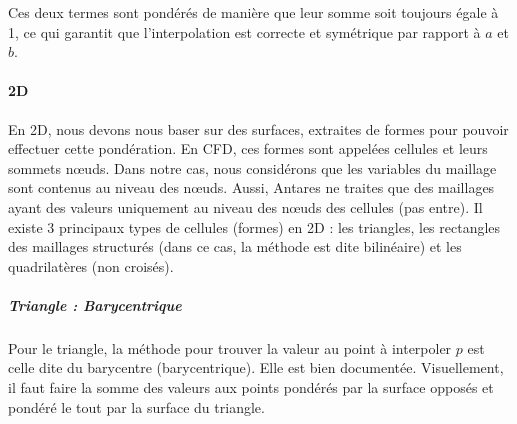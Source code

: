 Ces deux termes sont pondérés de manière que leur somme soit toujours égale à 1, ce
qui garantit que l'interpolation est correcte et symétrique par rapport à \( a \) et \( b \).\vspace{0.5cm}


\paragraph{2D}

En 2D, nous devons nous baser sur des surfaces, extraites de formes pour pouvoir effectuer cette pondération. En CFD, ces formes sont appelées cellules et leurs sommets nœuds. Dans notre cas, nous considérons que les variables du maillage sont contenus au niveau des nœuds. Aussi, Antares ne traites que des maillages ayant des valeurs uniquement au niveau des nœuds des cellules (pas entre).
Il existe 3 principaux types de cellules (formes) en 2D : les triangles, les rectangles des maillages structurés (dans ce cas, la méthode est dite bilinéaire) et les quadrilatères (non croisés).

\subparagraph{Triangle : Barycentrique}

Pour le triangle, la méthode pour trouver la valeur au point à interpoler \( p \) est celle dite du barycentre (barycentrique).
Elle est bien documentée. Visuellement, il faut faire la somme des valeurs aux points pondérés par la surface opposés et pondéré le tout par la surface du triangle.

